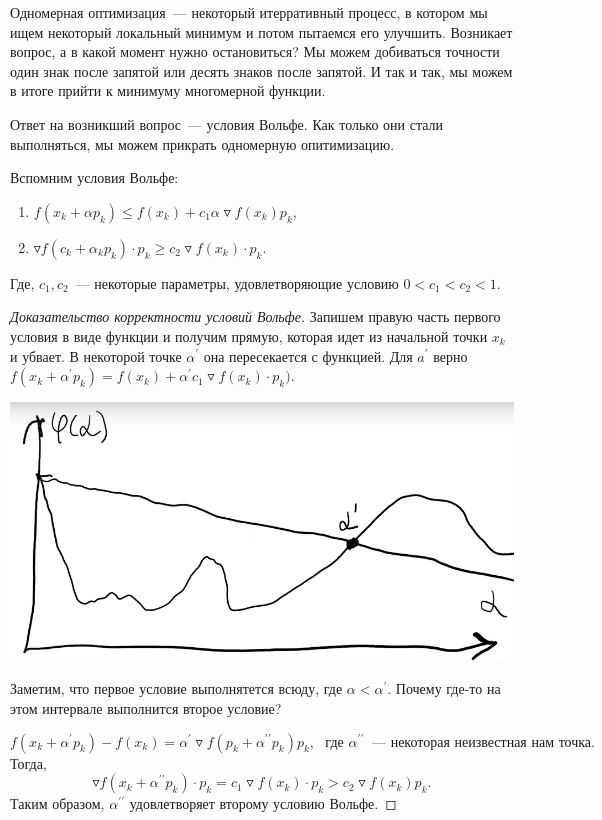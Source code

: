     Одномерная оптимизация~--- некоторый итерративный процесс, в котором мы ищем некоторый локальный минимум и потом пытаемся его улучшить. Возникает вопрос, а в какой момент нужно остановиться?
    Мы можем добиваться точности один знак после запятой или десять знаков после запятой. И так и так, мы можем в итоге прийти к минимуму многомерной функции.

    Ответ на возникший вопрос~--- условия Вольфе. Как только они стали выполняться, мы можем прикрать одномерную опитимизацию.

Вспомним условия Вольфе:
\begin{enumerate}
    \item $f(x_k + \alpha p_k) \leqslant f(x_k) + c_1 \alpha \triangledown f (x_k) p_k$,
    \item $\triangledown f(c_k + \alpha_k p_k) \cdot p_k \geqslant c_2 \triangledown f(x_k) \cdot p_k$.
\end{enumerate}
Где, $c_1, c_2$~--- некоторые параметры, удовлетворяющие условию     $0 < c_1 < c_2 < 1$.

\begin{proof}[Доказательство корректности условий Вольфе]
    Запишем правую часть первого условия в виде функции и получим прямую, которая идет из начальной точки $x_k$ и убвает. В некоторой точке $\alpha^\prime$ она пересекается с функцией. Для $a^\prime$ верно $f(x_k + \alpha^{\prime} p_k) = f(x_k) +\alpha^\prime c_1 \triangledown f(x_k) \cdot p_k)$.

\begin{center}
    \includegraphics[scale=0.4]{img/methopt_volfe_conditions_proof}
\end{center}
    Заметим, что первое условие выполнятется всюду, где $\alpha < \alpha^\prime$.
    Почему где-то на этом интервале выполнится второе условие?
    
    \[f(x_k  + \alpha^\prime p_k) - f(x_k) = \alpha^\prime \triangledown f(p_k +\alpha^{\prime\prime} p_k) p_k, ~~~ \text{где } \alpha^{\prime\prime} ~\text{ --- некоторая неизвестная нам точка}. \]
    Тогда,
    \[ \triangledown f(x_k + \alpha^{\prime\prime} p_k) \cdot p_k = c_1 \triangledown f(x_k) \cdot p_k > c_2 \triangledown f (x_k) p_k. \]
    Таким образом, $\alpha^{\prime\prime}$ удовлетворяет второму условию Вольфе.
\end{proof}

